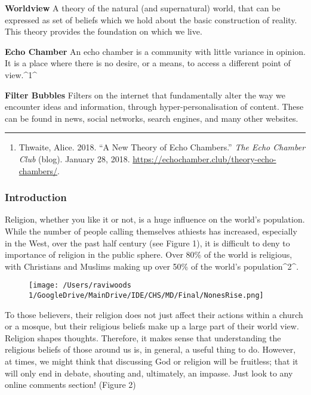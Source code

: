 \documentclass[]{article}
\begin{document}
\textbf{Worldview} A theory of the natural (and supernatural) world,
that can be expressed as set of beliefs which we hold about the basic
construction of reality. This theory provides the foundation on which we
live.

\textbf{Echo Chamber} An echo chamber is a community with little
variance in opinion. It is a place where there is no desire, or a means,
to access a different point of view.\^{}1\^{}

\textbf{Filter Bubbles } Filters on the internet that fundamentally
alter the way we encounter ideas and information, through
hyper-personalisation of content. These can be found in news, social
networks, search engines, and many other websites.

\begin{center}\rule{0.5\linewidth}{\linethickness}\end{center}

\begin{enumerate}
\def\labelenumi{\arabic{enumi}.}
\item
  Thwaite, Alice. 2018. ``A New Theory of Echo Chambers.'' \emph{The
  Echo Chamber Club} (blog). January 28, 2018.
  \url{https://echochamber.club/theory-echo-chambers/}.
\end{enumerate}

\hypertarget{header-n27}{%
\subsubsection{Introduction}\label{header-n27}}

Religion, whether you like it or not, is a huge influence on the world's
population. While the number of people calling themselves athiests has
increased, especially in the West, over the past half century (see
Figure 1), it is difficult to deny to importance of religion in the
public sphere. Over 80\% of the world is religious, with Christians and
Muslims making up over 50\% of the world's population\^{}2\^{}.

\begin{figure}
\centering
\texttt{[image: /Users/raviwoods 1/GoogleDrive/MainDrive/IDE/CHS/MD/Final/NonesRise.png]}
\caption{}
\end{figure}

To those believers, their religion does not just affect their actions
within a church or a mosque, but their religious beliefs make up a large
part of their world view. Religion shapes thoughts. Therefore, it makes
sense that understanding the religious beliefs of those around us is, in
general, a useful thing to do. However, at times, we might think that
discussing God or religion will be fruitless; that it will only end in
debate, shouting and, ultimately, an impasse. Just look to any online
comments section! (Figure 2)
\end{document}
